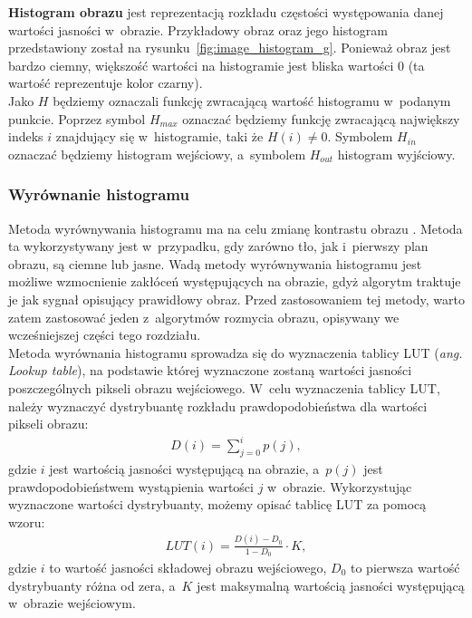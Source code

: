 \textbf{Histogram obrazu} jest reprezentacją rozkładu częstości występowania danej wartości jasności w~obrazie. Przykładowy obraz oraz jego histogram przedstawiony został na rysunku~\ref{fig:image_histogram_g}. Ponieważ obraz jest bardzo ciemny, większość wartości na histogramie jest bliska wartości 0 (ta wartość reprezentuje kolor czarny).\\
Jako $H$ będziemy oznaczali funkcję zwracającą wartość histogramu w~podanym punkcie. Poprzez symbol $H_{max}$ oznaczać będziemy funkcję zwracającą największy indeks $i$ znajdujący się w~histogramie, taki że $H(i) \neq 0$. Symbolem $H_{in}$ oznaczać będziemy histogram wejściowy, a~symbolem $H_{out}$ histogram wyjściowy.\\

\subsubsection{Wyrównanie histogramu}\label{sssec:histogram_eq}
Metoda wyrównywania histogramu ma na celu zmianę kontrastu obrazu \cite{acharya05}. Metoda ta wykorzystywany jest w~przypadku, gdy zarówno tło, jak i~pierwszy plan obrazu, są ciemne lub jasne. Wadą metody wyrównywania histogramu jest możliwe wzmocnienie zakłóceń występujących na obrazie, gdyż algorytm traktuje je jak sygnał opisujący prawidłowy obraz. Przed zastosowaniem tej metody, warto zatem zastosować jeden z~algorytmów rozmycia obrazu, opisywany we wcześniejszej części tego rozdziału.\\
Metoda wyrównania histogramu sprowadza się do wyznaczenia tablicy LUT (\textit{ang. Lookup table}), na podstawie której wyznaczone zostaną wartości jasności poszczególnych pikseli obrazu wejściowego. W~celu wyznaczenia tablicy LUT, należy wyznaczyć dystrybuantę rozkładu prawdopodobieństwa dla wartości pikseli obrazu:
\begin{gather*}
  D(i) = \sum\limits_{j=0}^i p(j),
\end{gather*}
gdzie $i$ jest wartością jasności występującą na obrazie, a~$p(j)$ jest prawdopodobieństwem wystąpienia wartości $j$ w~obrazie. Wykorzystując wyznaczone wartości dystrybuanty, możemy opisać tablicę LUT za pomocą wzoru:
\begin{gather*}
  LUT(i) = \frac{D(i)-D_0}{1-D_0} \cdot K,
\end{gather*}
gdzie $i$ to wartość jasności składowej obrazu wejściowego, $D_0$ to pierwsza wartość dystrybuanty różna od zera, a~$K$ jest maksymalną wartością jasności występującą w~obrazie wejściowym.\\
